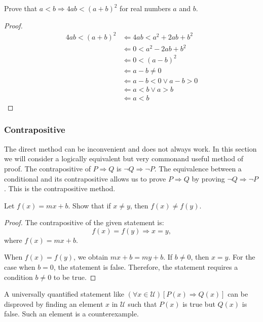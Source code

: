 \documentclass[../main.tex]{subfiles}
\begin{document}
\begin{ex}
    Prove that $a < b \Rightarrow 4ab < (a + b)^2$ for real numbers $a$ and $b$.
\end{ex}
\begin{proof}
    \begin{align*}
        4ab < (a + b)^2 &\Leftarrow 4ab < a^2 + 2ab + b^2\\
                        &\Leftarrow 0 < a^2 - 2ab + b^2\\
                        &\Leftarrow 0 < (a - b)^2\\
                        &\Leftarrow a - b \neq 0\\
                        &\Leftarrow a - b <0 \vee a - b >0\\
                        &\Leftarrow a < b \vee a > b\\
                        &\Leftarrow a < b
    \end{align*}
\end{proof}

\subsubsection{Contrapositive}
The direct method can be inconvenient and does not always work.
In this section we will consider a logically equivalent but very commonand useful method of proof.
The \textsf{contrapositive} of $P \Rightarrow Q$ is $\neg Q \Rightarrow \neg P$. The equivalence between a conditional and its contrapositive allows us to prove $P \Rightarrow Q$ by proving $\neg Q \Rightarrow \neg P$. This is the \textsf{contrapositive method}.

\begin{ex}
    Let $f(x) = mx + b$.
    Show that if $x \neq y$, then $f(x) \neq f(y)$.
\end{ex}
\begin{proof}
    The contrapositive of the given statement is:
    \[
        f(x) = f(y) \Rightarrow x = y,
    \]
    where $f(x) = mx + b$.

    When $f(x) = f(y)$, we obtain $mx + b = my +b$. If $b \neq 0$, then $x = y$.
    For the case when $b = 0$, the statement is false.
    Therefore, the statement requires a condition $b \neq 0$ to be true.
\end{proof}

A universally quantified statement like $(\forall x \in \mathcal{U})[P(x) \Rightarrow Q(x)]$ can be disproved by finding an element $x$ in $\mathcal{U}$ such that $P(x)$ is true but $Q(x)$ is false. Such an element is a \textsf{counterexample}.
\end{document}
